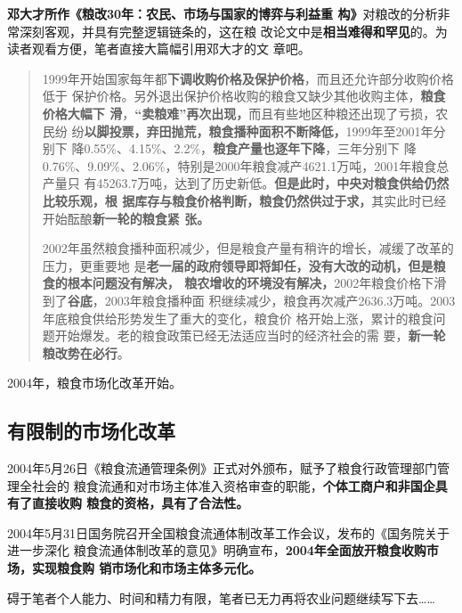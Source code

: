 \textbf{邓大才所作《粮改30年：农民、市场与国家的博弈与利益重
  构》}\cite{dacailianggai}对粮改的分析非常深刻客观，并具有完整逻辑链条的，这在粮
改论文中是\textbf{相当难得和罕见}的。为读者观看方便，笔者直接大篇幅引用邓大才的文
章吧。

\begin{quotation}
  1999年开始国家每年都\textbf{下调收购价格及保护价格}，而且还允许部分收购价格低于
  保护价格。另外退出保护价格收购的粮食又缺少其他收购主体，\textbf{粮食价格大幅下
    滑}，\textbf{“卖粮难”再次出现，}而且有些地区种粮还出现了亏损，农民纷
  纷\textbf{以脚投票，弃田抛荒，粮食播种面积不断降低，}1999年至2001年分别下
  降0.55\%、4.15\%、2.2\%，\textbf{粮食产量也逐年下降}，三年分别下
  降0.76\%、9.09\%、2.06\%，特别是2000年粮食减产4621.1万吨，2001年粮食总产量只
  有45263.7万吨，达到了历史新低。\textbf{但是此时，中央对粮食供给仍然比较乐观，根
    据库存与粮食价格判断，粮食仍然供过于求，}其实此时已经开始酝酿\textbf{新一轮的粮食紧
    张。}

  2002年虽然粮食播种面积减少，但是粮食产量有稍许的增长，减缓了改革的压力，更重要地
  是\textbf{老一届的政府领导即将卸任，没有大改的动机，但是粮食的根本问题没有解决，
    粮农增收的环境没有解决，}2002年粮食价格下滑到了\textbf{谷底}，2003年粮食播种面
  积继续减少，粮食再次减产2636.3万吨。2003年底粮食供给形势发生了重大的变化，粮食价
  格开始上涨，累计的粮食问题开始爆发。老的粮食政策已经无法适应当时的经济社会的需
  要，\textbf{新一轮粮改势在必行}。
\end{quotation}

2004年，粮食市场化改革开始。

\subsection{有限制的市场化改革}


2004年5月26日《粮食流通管理条例》正式对外颁布，赋予了粮食行政管理部门管理全社会的
粮食流通和对市场主体准入资格审查的职能，\textbf{个体工商户和非国企具有了直接收购
  粮食的资格，具有了合法性。}

2004年5月31日国务院召开全国粮食流通体制改革工作会议，发布的《国务院关于进一步深化
粮食流通体制改革的意见》明确宣布，\textbf{2004年全面放开粮食收购市场，实现粮食购
  销市场化和市场主体多元化。}

碍于笔者个人能力、时间和精力有限，笔者已无力再将农业问题继续写下去……

